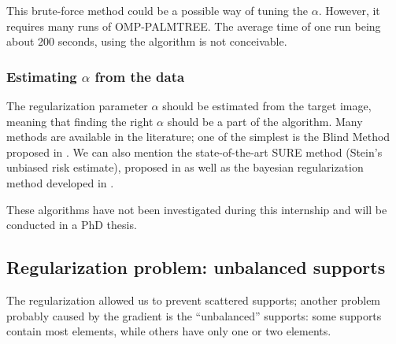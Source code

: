 
\noindent
This brute-force method could be a possible way of tuning the $\alpha$. However, it requires many runs of OMP-PALMTREE. The average time of one run being about 200 seconds, using the algorithm is not conceivable.

\subsubsection{Estimating $\alpha$ from the data}

The regularization parameter $\alpha$ should be estimated from the target image, meaning that finding the right $\alpha$ should be a part of the algorithm. Many methods are available in the literature; one of the simplest is the Blind Method proposed in \cite{almeida_parameter_2013}. We can also mention the state-of-the-art SURE method (Stein’s unbiased risk estimate), proposed in \cite{eldar_generalized_2009} as well as the bayesian regularization method developed in \cite{archer_bayesian/regularization_1995}.

These algorithms have not been investigated during this internship and will be conducted in a PhD thesis.

\subsection{Regularization problem: unbalanced supports}\label{sec_pbm_unbalanced_supports}
The regularization allowed us to prevent scattered supports; another problem probably caused by the gradient is the “unbalanced” supports: some supports contain most elements, while others have only one or two elements. 

